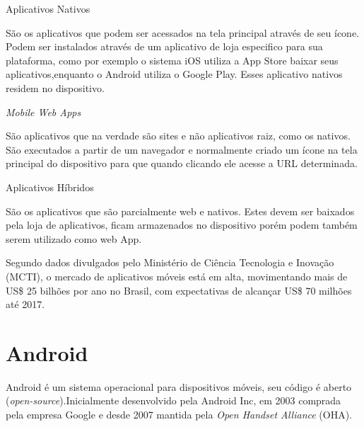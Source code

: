 \begin{alineascomponto}

\item Aplicativos Nativos

São os aplicativos que podem ser acessados na tela principal através de seu ícone. Podem ser instalados através de um aplicativo de loja especifico para sua plataforma, como por exemplo o sistema iOS utiliza a App Store baixar seus aplicativos,enquanto o Android utiliza o Google Play. Esses aplicativo nativos residem no dispositivo.

\item \textit{Mobile Web Apps}

São aplicativos que na verdade são sites e não aplicativos raiz, como os nativos. São executados a partir de um navegador e normalmente criado um ícone na tela principal do dispositivo para que quando clicando ele acesse a URL determinada.

\item Aplicativos Híbridos

São os aplicativos que são parcialmente web e nativos.
Estes devem ser baixados pela loja de aplicativos, ficam armazenados no dispositivo porém podem também serem utilizado como web App.

	\end{alineascomponto} 
	
Segundo dados divulgados pelo Ministério de Ciência Tecnologia e Inovação (MCTI), o mercado de aplicativos móveis está em alta, movimentando mais de US\$ 25 bilhões por ano no Brasil, com expectativas de alcançar US\$ 70 milhões até 2017. \cite{mcti}
	
	

	

\section{Android}
\label{sec:Android}
Android é um sistema operacional para dispositivos móveis, seu código é aberto (\textit{open-source}).Inicialmente desenvolvido pela Android Inc, em 2003 comprada pela empresa Google e desde 2007 mantida pela \textit{Open Handset Alliance} (OHA).

